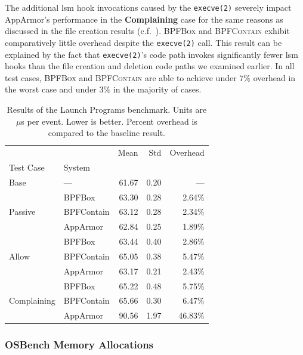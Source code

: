 \documentclass[
  fontsize=12pt,
  titlepage=firstiscover,
  paper=letter,
oneside,
  cleardoublepage=plain,
  parskip=half-,
  DIV=10,
  parindent,
  appendixprefix,
  chapterprefix,
  listof=totoc,
]{scrbook}
\newcommand{\bpfbox}{\textsc{BPFBox}}
\newcommand{\bpfcontain}{\textsc{BPFContain}}
\begin{document}
The additional \gls{lsm} hook invocations caused by the \texttt{execve(2)} severely impact
AppArmor's performance in the \textbf{Complaining} case for the same reasons as discussed
in the file creation results (c.f.\ ). \bpfbox{} and \bpfcontain{}
exhibit comparatively little overhead despite the \texttt{execve(2)} call. This result
can be explained by the fact that \texttt{execve(2)}'s code path invokes significantly
fewer \gls{lsm} hooks than the file creation and deletion code paths we examined earlier.
In all test cases, \bpfbox{} and \bpfcontain{} are able to achieve under $7\%$ overhead in
the worst case and under $3\%$ in the majority of cases.



\begin{table}[ht!]
\centering
\footnotesize
\caption[Results of the Launch Programs benchmark]{Results of the Launch Programs benchmark. Units are $\mu$s per event. Lower is better. Percent overhead is compared to the baseline result.}
\label{tab:phoronix-launch-programs}
\begin{tabular}{llrrr}
\toprule
            &          &   Mean &   Std & Overhead \\
Test Case & System &        &       &          \\
\midrule
Base & --- &  61.67 &  0.20 &      --- \\
\cline{1-5}
\multirow{3}{*}{Passive} & BPFBox &  63.30 &  0.28 &   2.64\% \\
            & BPFContain &  63.12 &  0.28 &   2.34\% \\
            & AppArmor &  62.84 &  0.25 &   1.89\% \\
\cline{1-5}
\multirow{3}{*}{Allow} & BPFBox &  63.44 &  0.40 &   2.86\% \\
            & BPFContain &  65.05 &  0.38 &   5.47\% \\
            & AppArmor &  63.17 &  0.21 &   2.43\% \\
\cline{1-5}
\multirow{3}{*}{Complaining} & BPFBox &  65.22 &  0.48 &   5.75\% \\
            & BPFContain &  65.66 &  0.30 &   6.47\% \\
            & AppArmor &  90.56 &  1.97 &  46.83\% \\
\bottomrule
\end{tabular}
\end{table}


\subsubsection{OSBench Memory Allocations}
\end{document}
